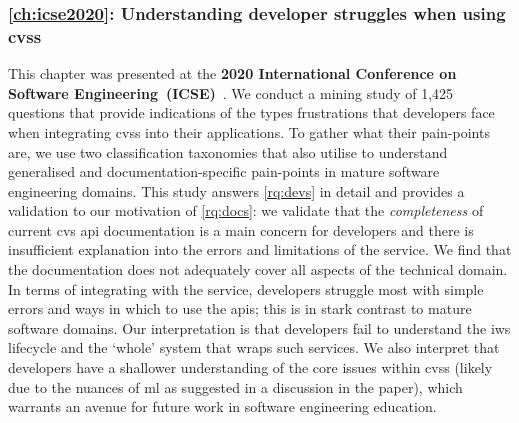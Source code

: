 \subsubsection[Chapter 5: Understanding developer struggles when using CVSs]{\cref{ch:icse2020}: Understanding developer struggles when using \glspl{cvs}} This chapter was presented at the \textbf{2020 International Conference on Software Engineering~(ICSE)}~\citep{Cummaudo:2020icse}. We conduct a mining study of 1,425  questions that provide indications of the types frustrations that developers face when integrating \glspl{cvs} into their applications. To gather what their pain-points are, we use two classification taxonomies that also utilise  to understand generalised and documentation-specific pain-points in mature software engineering domains. This study answers \ref{rq:devs} in detail and provides a validation to our motivation of \ref{rq:docs}: we validate that the \textit{completeness} of current \gls{cvs} \gls{api} documentation is a main concern for developers and there is insufficient explanation into the errors and limitations of the service. We find that the documentation does not adequately cover all aspects of the technical domain. In terms of integrating with the service, developers struggle most with simple errors and ways in which to use the \glspl{api}; this is in stark contrast to mature software domains. Our interpretation is that developers fail to understand the \gls{iws} lifecycle and the `whole' system that wraps such services. We also interpret that developers have a shallower understanding of the core issues within \glspl{cvs} (likely due to the nuances of \gls{ml} as suggested in a discussion in the paper), which warrants an avenue for future work in software engineering education.

